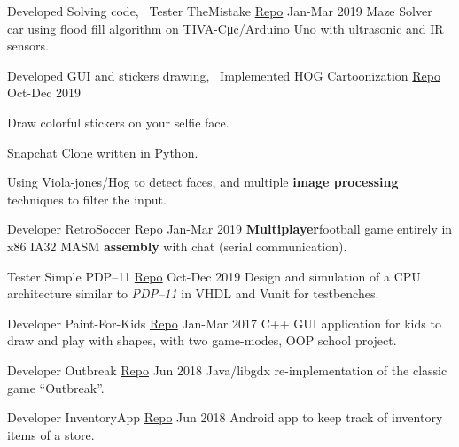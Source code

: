 \begin{cventries}
  \cventry
    {Developed Solving code, ~Tester} %
    {TheMistake \tiny{\href{https://www.github.com/Abdulrahman-Khalid/mazeSolver}{Repo}}} %
    {} %
    {Jan-Mar 2019} %
    {
      {Maze Solver ​ car using flood fill algorithm on \href{http://www.ti.com/tool/EK-TM4C123GXL}{​TIVA-C ​μc}​/Arduino Uno with ultrasonic and IR sensors.}
    }

  \cventry
    {Developed GUI and stickers drawing, ~Implemented HOG} %
    {Cartoonization \tiny{\href{http://github.com/Abdulrahman-Khalid/Cartoonization/}{Repo}}} %
    {} %
    {Oct-Dec 2019} %
    {
      \begin{cvitems} %
        \item {Draw colorful stickers on your selfie face.}
        \item {Snapchat Clone written in Python.}
        \item {Using ​Viola-jones/Hog ​to detect faces, and multiple \textbf{image processing} techniques to filter the input.}
      \end{cvitems}
    }

  \cventry
    {Developer} %
    {RetroSoccer \tiny{\href{https://github.com/mido3ds/retrosoccer}{Repo}}} %
    {} %
    {Jan-Mar 2019} %
    {
      {\textbf{Multiplayer​} football ​game​ entirely in x86 IA32 MASM \textbf{​assembly​} with chat (serial communication).}
    }

  \cventry
    {Tester} %
    {Simple PDP--11 \tiny{\href{https://github.com/mido3ds/simple-pdp11}{Repo}}} %
    {} %
    {Oct-Dec 2019} %
    {
      Design and simulation of a CPU architecture similar to \emph{PDP--11} in VHDL and Vunit for testbenches.
    }


  \cventry
    {Developer} %
    {Paint-For-Kids \tiny{\href{https://github.com/mido3ds/paint-for-kids}{Repo}}} %
    {} %
    {Jan-Mar 2017} %
    {
      {C++ ​GUI​ application for kids to ​ draw​ and play with shapes, with ​two game-modes​, OOP school project.}
    }

  \cventry
    {Developer} %
    {Outbreak \tiny{\href{https://github.com/mido3ds/Outbreak}{Repo}}} %
    {} %
    {Jun 2018} %
    {
      {Java​/libgdx re-implementation of the classic ​game​ ``Outbreak”.}
    }

  \cventry
    {Developer} %
    {InventoryApp \tiny{\href{https://github.com/mido3ds/InventoryApp}{Repo}}} %
    {} %
    {Jun 2018} %
    {
      Android​ app to keep track of inventory ​items of a store​.
    }


\end{cventries}
